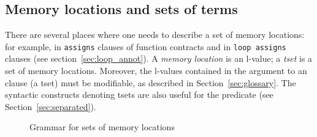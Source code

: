 \subsection{Memory locations and sets of terms}
\label{sec:locations}

There are several places where one needs to describe a set of memory
locations: for example, in \lstinline|assigns| clauses of function contracts and
in \lstinline|loop assigns| clauses (see section~\ref{sec:loop_annot}).
A \emph{memory location} is an l-value; a \emph{tset} is a set of
memory locations. Moreover, the l-values contained in the argument to
an \assigns{} clause (a tset) must be modifiable, as described in
Section~\ref{sec:glossary}. 
The syntactic constructs denoting tsets are also useful for the \separated predicate (see Section~\ref{sec:separated}).

\begin{figure}
  \begin{cadre}
      
    \end{cadre}
  \caption{Grammar for sets of memory locations}
\label{fig:gram:locations}
\end{figure}

